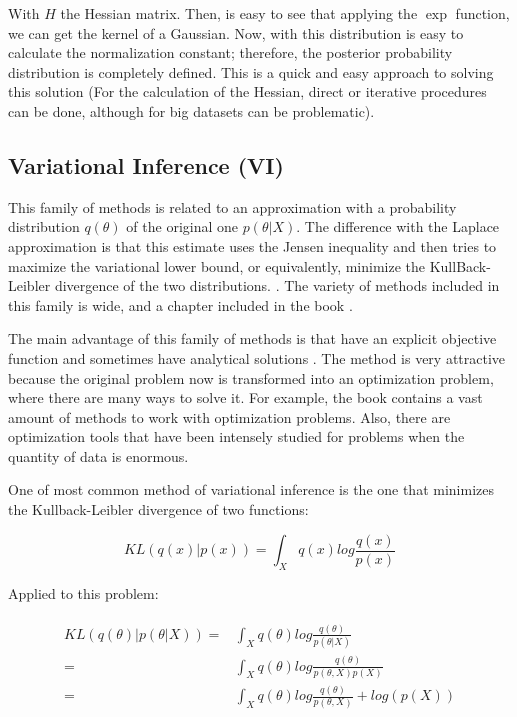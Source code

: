\documentclass{article}
\begin{document}
With $H$ the Hessian matrix. Then, is easy to see that applying the $\exp$ function, we can get the kernel of a Gaussian. Now, with this distribution is easy to calculate the normalization constant; therefore, the posterior probability distribution is completely defined. This is a quick and easy approach to solving this solution (For the calculation of the Hessian, direct or iterative procedures can be done, although for big datasets can be problematic).

\subsection{Variational Inference (VI)}

This family of methods is related to an approximation with a probability distribution $q(\theta)$ of the original one $p(\theta | X)$. The difference with the Laplace approximation is that this estimate uses the Jensen inequality and then tries to maximize the variational lower bound, or equivalently, minimize the KullBack-Leibler divergence of the two distributions. \cite{gal2016uncertainty}. The variety of methods included in this family is wide, and a chapter included in the book \cite{bishop2006pattern}.

The main advantage of this family of methods is that have an explicit objective function and sometimes have analytical solutions \cite{salimans2015markov}. The method is very attractive because the original problem now is transformed into an optimization problem, where there are many ways to solve it. For example, the book \cite{nocedal2006numerical} contains a vast amount of methods to work with optimization problems. Also, there are optimization tools that have been intensely studied for problems when the quantity of data is enormous. 

One of most common method of variational inference is the one that minimizes the Kullback-Leibler divergence of two functions:

\begin{equation}
KL(q(x)|p(x)) = \int_{X} q(x) log \frac{q(x)}{p(x)}
\end{equation}

Applied to this problem:

\begin{align}
\begin{split}
KL(q(\theta)|p(\theta|X)) =& \int_{X} q(\theta) log \frac{q(\theta)}{p(\theta|X)} \\
                          =& \int_{X} q(\theta) log \frac{q(\theta)}{p(\theta, X) p(X)} \\
                          =& \int_{X} q(\theta) log \frac{q(\theta)}{p(\theta, X)} + log(p(X)) 
\end{split}
\end{align}
\end{document}

